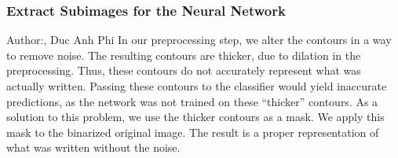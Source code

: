 \documentclass[12pt]{article}
\begin{document}
\subsubsection{Extract Subimages for the Neural Network}
\small{Author:, Duc Anh Phi} \newline \newline
In our preprocessing step, we alter the contours in a way to remove noise. The resulting contours are thicker, due to dilation in the preprocessing. Thus, these contours do not accurately represent what was actually written. Passing these contours to the classifier would yield inaccurate predictions, as the network was not trained on these “thicker” contours.
As a solution to this problem, we use the thicker contours as a mask. We apply this mask to the binarized original image. The result is a proper representation of what was written without the noise.
\end{document}
